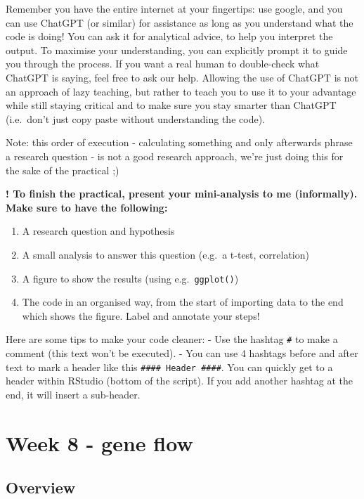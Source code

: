 \documentclass[
  letterpaper,
  DIV=11,
  numbers=noendperiod]{scrreprt}
\providecommand{\tightlist}{%
  \setlength{\itemsep}{0pt}\setlength{\parskip}{0pt}}\usepackage{longtable,booktabs,array}
\begin{document}
Remember you have the entire internet at your fingertips: use google,
and you can use ChatGPT (or similar) for assistance as long as you
understand what the code is doing! You can ask it for analytical advice,
to help you interpret the output. To maximise your understanding, you
can explicitly prompt it to guide you through the process. If you want a
real human to double-check what ChatGPT is saying, feel free to ask our
help. Allowing the use of ChatGPT is not an approach of lazy teaching,
but rather to teach you to use it to your advantage while still staying
critical and to make sure you stay smarter than ChatGPT (i.e.~don't just
copy paste without understanding the code).

Note: this order of execution - calculating something and only
afterwards phrase a research question - is not a good research approach,
we're just doing this for the sake of the practical ;)

\textbf{! To finish the practical, present your mini-analysis to me
(informally). Make sure to have the following:}

\begin{enumerate}
\def\labelenumi{\arabic{enumi}.}
\tightlist
\item
  A research question and hypothesis
\item
  A small analysis to answer this question (e.g.~a t-test, correlation)
\item
  A figure to show the results (using e.g.~\texttt{ggplot()})
\item
  The code in an organised way, from the start of importing data to the
  end which shows the figure. Label and annotate your steps!
\end{enumerate}

Here are some tips to make your code cleaner: - Use the hashtag
\texttt{\#} to make a comment (this text won't be executed). - You can
use 4 hashtags before and after text to mark a header like this
\texttt{\#\#\#\#\ Header\ \#\#\#\#}. You can quickly get to a header
within RStudio (bottom of the script). If you add another hashtag at the
end, it will insert a sub-header.


\chapter{Week 8 - gene flow}\label{week-8---gene-flow}

\section{Overview}\label{overview}
\end{document}
